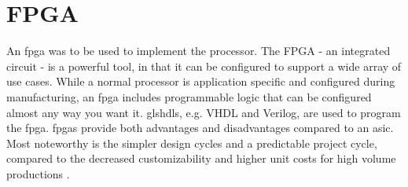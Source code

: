 \section{FPGA}
An \gls{fpga} was to be used to implement the processor.
The FPGA - an integrated circuit - is a powerful tool, in that it can be configured to support a wide array of use cases.
While a normal processor is application specific and configured during manufacturing, an \gls{fpga} includes programmable logic that can be configured almost any way you want it\cite{fpga}.
gls{hdl}s, e.g. VHDL and Verilog, are used to program the \gls{fpga}.
\gls{fpga}s provide both advantages and disadvantages compared to an \gls{asic}.
Most noteworthy is the simpler design cycles and a predictable project cycle, compared to the decreased customizability and higher unit costs for high volume productions \cite{fpgavsasic}.

